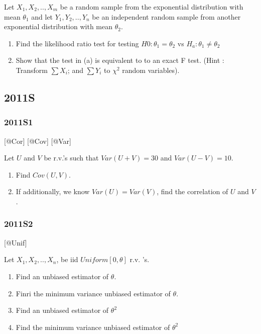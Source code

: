 \documentclass[6pt,Portrait]{article}
\begin{document}
Let \(X_1,X_2,..,X_{m}\) be a random sample from the exponential
distribution with mean \(\theta_1\) and let \(Y_1,Y_2,..,Y_{n}\) be an
independent random sample from another exponential distribution with
mean \(\theta_2\).

\begin{enumerate}
\def\labelenumi{(\alph{enumi})}
\item
  Find the likelihood ratio test for testing \(H0:\theta_1=\theta_2\) vs
  \(H_a:\theta_1\neq\theta_2\)
\item
  Show that the test in (a) is equivalent to to an exact F test. (Hint :
  Transform \(\sum X_i\); and \(\sum Y_i\) to \(\chi^2\) random
  variables).
\end{enumerate}

\hypertarget{s-5}{%
\subsection{2011S}\label{s-5}}

\hypertarget{s1-2}{%
\subsubsection{2011S1}\label{s1-2}}

{[}@Cor{]} {[}@Cov{]} {[}@Var{]}

Let \(U\) and \(V\) be r.v.'s such that \(Var(U+V)=30\) and
\(Var(U-V)=10\).

\begin{enumerate}
\def\labelenumi{(\alph{enumi})}
\item
  Find \(Cov(U,V)\).
\item
  If additionally, we know \(Var(U)=Var(V)\), find the correlation of
  \(U\) and \(V\).
\end{enumerate}

\hypertarget{s2-2}{%
\subsubsection{2011S2}\label{s2-2}}

{[}@Unif{]}

Let \(X_1,X_2,..,X_{n}\), be iid \(Uniform[0,\theta]\) r.v. 's.

\begin{enumerate}
\def\labelenumi{(\alph{enumi})}
\item
  Find an unbiased estimator of \(\theta\).
\item
  Finri the minimum variance unbiased estimator of \(\theta\).
\item
  Find an unbiased estimator of \(\theta^2\)
\item
  Find the minimum variance unbiased estimator of \(\theta^2\)
\end{enumerate}
\end{document}
